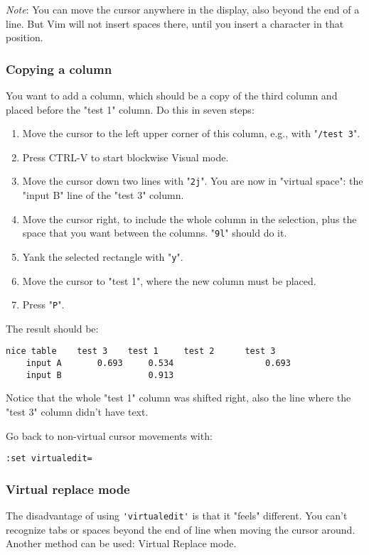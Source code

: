 \emph{Note}: You can move the cursor anywhere in the display, also beyond the end of a line.
But Vim will not insert spaces there, until you insert a character in that position.

\subsubsection{Copying a column}
You want to add a column, which should be a copy of the third column and placed before the "test 1" column.
Do this in seven steps:

\begin{enumerate}
\item Move the cursor to the left upper corner of this column, e.g., with "\verb!/test 3!".
\item Press CTRL-V to start blockwise Visual mode.
\item Move the cursor down two lines with "\verb!2j!".  You are now in "virtual space": the "input B" line of the "test 3" column.
\item Move the cursor right, to include the whole column in the selection, plus the space that you want between the columns.  "\verb!9l!" should do it.
\item Yank the selected rectangle with "\verb!y!".
\item Move the cursor to "test 1", where the new column must be placed.
\item Press "\verb!P!".
\end{enumerate}

The result should be:

\begin{Verbatim}[samepage=true]
    nice table    test 3    test 1     test 2      test 3 
    input A       0.693     0.534                  0.693 
    input B                 0.913 
\end{Verbatim}

Notice that the whole "test 1" column was shifted right, also the line where the "test 3" column didn't have text.

Go back to non-virtual cursor movements with:

\begin{Verbatim}[samepage=true]
 :set virtualedit=
\end{Verbatim}

\subsubsection{Virtual replace mode}
The disadvantage of using \verb!'virtualedit'! is that it "feels" different.
You can't recognize tabs or spaces beyond the end of line when moving the cursor around.
Another method can be used: Virtual Replace mode.


